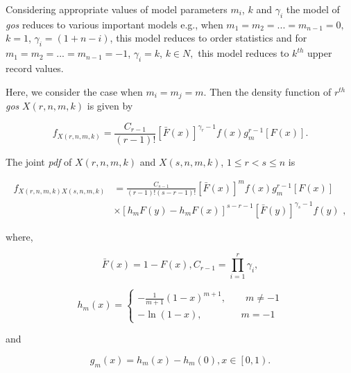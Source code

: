 \documentclass[11pt,a4paper]{article}
\numberwithin{equation}{section}
\begin{document}
	Considering appropriate values of model parameters  $m_{i}$, $k$ and $\gamma _{i}$ the model of \textit{gos} reduces to various important models e.g., when $m_{1} =m_{2} =...=m_{n-1} =0,$ $k=1$, $\gamma _{i} =\left(1+n-i\right)$, this model reduces to order statistics and for $m_{1} =m_{2} =...=m_{n-1} =-1$, $\gamma _{i} =k$,  $k\in N,$ this model reduces to $k^{th}$ upper record values.

	Here, we consider the case when $m_{i} =m_{j} =m$. Then the density function of $r^{th} $ \textit{gos} $X\left(r,n,m,k\right)$ is given by

	\begin{equation} \label{gos.cdf}

		f_{X\left(r,n,m,k\right)} =\frac{C_{r-1} }{\left(r-1\right)!} \left[\bar{F}\left(x\right)\right]^{\gamma _{r} -1} f\left(x\right)g_{m}^{r-1} \left[F\left(x\right)\right].     

	\end{equation} 

	The joint \textit{pdf} of $X\left(r,n,m,k\right)$ and $X\left(s,n,m,k\right)$, $1\le r<s\le n$ is

	\begin{align}  \label{jointpdf.gos}

		f_{X\left(r,n,m,k\right)X\left(s,n,m,k\right)} &=\frac{C_{s-1} }{\left(r-1\right)!\left(s-r-1\right)!} \left[\bar{F}\left(x\right)\right]^{m} f\left(x\right)g_{m}^{r-1} \left[F\left(x\right)\right] \nonumber \\

		&\times \left[h_{m} F\left(y\right)-h_{m} F\left(x\right)\right]^{s-r-1}\left[\bar{F}\left(y\right)\right]^{\gamma _{s} -1} f\left(y\right)\, \, , 

	\end{align}

	where,

	\[\bar{F}\left(x\right)=1-F\left(x\right)  , C_{r-1} =\prod _{i=1}^{r}\gamma _{i}   ,\] 

	\[h_{m} \left(x\right)=\left\{\begin{array}{c} {-\frac{1}{m+1} \left(1-x\right)^{m+1}, \qquad m\ne -1} \\ {-\ln \left(1-x\right),\qquad \qquad m=-1} \end{array}\right. \] 

	and

	\[g_{m} \left(x\right)=h_{m} \left(x\right)-h_{m} \left(0\right),   x\in \left[0,1\right).\] 

	
\end{document}
